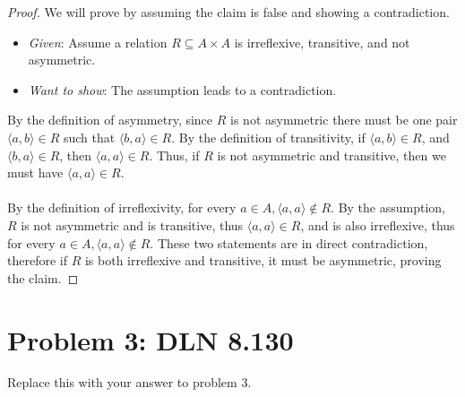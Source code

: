 \documentclass[titlepage]{article}
\begin{document}
\begin{proof}
We will prove by assuming the claim is false and showing a contradiction.

\begin{itemize}
\item \emph{Given}: Assume a relation $R \subseteq A \times A$ is irreflexive, transitive, and not asymmetric.  
\item \emph{Want to show}: The assumption leads to a contradiction.
\end{itemize}
By the definition of asymmetry, since $R$ is not asymmetric there must be one pair $\langle a,b\rangle \in R$ such that $\langle b,a\rangle \in R$. By the definition of transitivity, if $\langle a,b \rangle \in R$, and $\langle b,a\rangle \in R$, then $\langle a,a\rangle \in R$. Thus, if $R$ is not asymmetric and transitive, then we must have $\langle a,a \rangle \in R$.
\\
\\
By the definition of irreflexivity, for every $a \in A, \langle a,a\rangle \notin R$. By the assumption, $R$ is not asymmetric and is transitive, thus $\langle a,a \rangle \in R$, and is also irreflexive, thus for every $a \in A, \langle a,a\rangle \notin R$. These two statements are in direct contradiction, therefore if $R$ is both irreflexive and transitive, it must be asymmetric, proving the claim.


\end{proof}

\section{Problem 3: DLN 8.130}

Replace this with your answer to problem 3.
\end{document}
